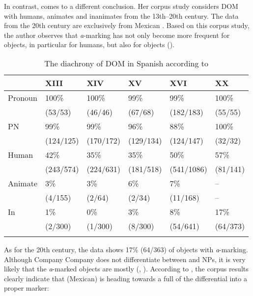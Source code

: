 \documentclass[output=paper]{LSP/langsci}
\begin{document}
In contrast, \citet{Company2002Avance,Company2002Grammaticalization} comes to a different conclusion. Her corpus study considers DOM with humans, animates and inanimates from the 13th--20th century. The data from the 20th century are exclusively from Mexican . Based on this corpus study, the author observes that \textit{a}-marking has not only become more frequent for  objects, in particular for humans, but also for  objects (\cf {}).

\begin{table}
{\small \begin{tabularx}{\textwidth}{LLLLLL} 
\lsptoprule
& XIII & XIV & XV & XVI & XX\\
\midrule
Pronoun & 100\% & 100\% & 99\% & 99\% & 100\% \\
& (53/53) & (46/46) & (67/68) & (182/183) & (55/55)\\

PN & 99\% & 99\% & 96\% & 88\% & 100\% \\
	 & (124/125) & (170/172) & (129/134) & (124/147) & (32/32)\\

Human & 42\% & 35\% & 35\% & 50\% & 57\% \\
	 & (243/574) & (224/631) & (181/518) & (541/1086) & (81/141)\\

Animate & 3\% & 3\% & 6\% & 7\% &--\\
	 & (4/155) & (2/64) & (2/34) & (11/168) &--\\

In & 1\% & 0\% & 3\% & 8\% & 17\% \\
	 & (2/300) & (1/300) & (8/300) & (54/641) & (64/373)\\
\lspbottomrule
\end{tabularx}
}\caption{The diachrony of DOM in Spanish according to \citet[207]{Company2002Grammaticalization}} \label{08-ga-tab:5}
\end{table}

As for the 20th century, the data shows 17\% (64/363) of  objects with \textit{a}-marking. Although Company Company does not differentiate between  and  NPs, it is very likely that the \textit{a}-marked  objects are mostly  (\cf \citealt[28, 108]{Barraza2003Evolucion}, \citealt[38--39, 81--87]{GarciaGarcia2014Objektmarkierung}). According to \citet{Company2002Avance,Company2002Grammaticalization}, the corpus results clearly indicate that (Mexican)  is heading towards a full  of the differential  into a proper  marker:
\end{document}
